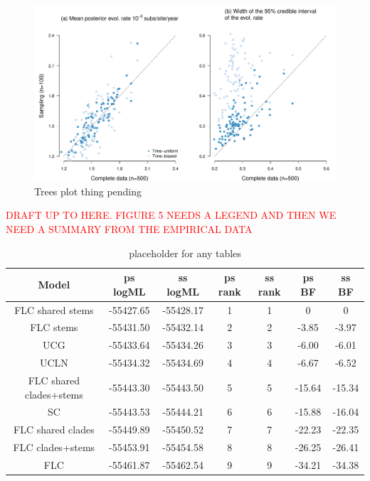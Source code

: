 \documentclass[11pt]{article}
\begin{document}
\begin{figure}[H]
	\begin{center}
		\includegraphics[scale=0.4, angle=0]{sampling_bias_summary_rates.pdf}
		\caption{Trees plot thing pending}
		\label{figure:Fig5}
	\end{center}
\end{figure}


\textcolor{red}{DRAFT UP TO HERE. FIGURE 5 NEEDS A LEGEND AND THEN WE NEED A SUMMARY FROM THE EMPIRICAL DATA}
	

\begin{table}[H]
	\begin{center}
		\caption{placeholder for any tables}
		\label{table:table2}
		\begin{tabular}{c|c|c|c|c|c|c}
			\textbf{Model} & \textbf{ps logML} & \textbf{ss logML} & \textbf{ps rank} & \textbf{ss rank} & \textbf{ps BF} & \textbf{ss BF} \\ 
			\hline
		FLC shared stems & -55427.65 & -55428.17 & 1 & 1 & 0 & 0 \\ 
		FLC stems & -55431.50 & -55432.14 & 2 & 2 & -3.85 & -3.97 \\
		UCG	&	-55433.64 & -55434.26 & 3 & 3 & -6.00 & -6.01 \\
		UCLN & -55434.32 & -55434.69 & 4 & 4 & -6.67 & -6.52 \\ 
		FLC shared clades+stems & -55443.30 & -55443.50 & 5 & 5 & -15.64 & -15.34 \\ 
		SC & -55443.53 & -55444.21 & 6 & 6 & -15.88 & -16.04\\ 
		FLC shared clades & -55449.89 & -55450.52 & 7 & 7 & -22.23 & -22.35 \\ 
		FLC clades+stems & -55453.91 & -55454.58 & 8 & 8 & -26.25 & -26.41 \\ 
		FLC & -55461.87 & -55462.54 & 9 & 9 & -34.21 & -34.38 \\ 
		\end{tabular}
	\end{center}
\end{table}
\end{document}
